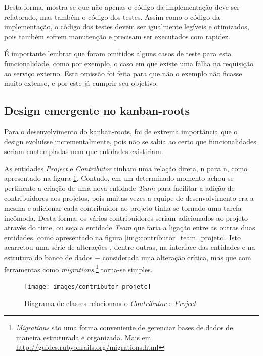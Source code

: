 Desta forma, mostra-se que não apenas o código da implementação deve ser refatorado, mas também o código dos testes. Assim como o código da implementação, o código dos testes devem ser igualmente legíveis e otimizados, pois também sofrem manutenção e precisam ser executados com rapidez.

É importante lembrar que foram omitidos alguns casos de teste para esta funcionalidade, como por exemplo, o caso em que existe uma falha na requisição ao serviço externo. Esta omissão foi feita para que não o exemplo não ficasse muito extenso, e por este já cumprir seu objetivo.


\subsection{Design emergente no kanban-roots}
\label{sub:design_emergente_no_kanban_roots}

Para o desenvolvimento do kanban-roots, foi de extrema importância que o design evoluísse incrementalmente, pois não se sabia ao certo que
funcionalidades seriam contempladas nem que entidades existiriam.

As entidades \textit{Project} e \textit{Contributor} tinham uma relação direta, n para n, como apresentado na figura \ref{img:contributor_projetc}. Contudo, em um determinado momento achou-se pertinente a criação de uma nova entidade \textit{Team} para facilitar a adição de contribuidores aos projetos, pois muitas vezes a equipe de desenvolvimento era a mesma e adicionar cada contribuidor ao projeto tinha se tornado uma tarefa incômoda. Desta forma, os vários contribuidores seriam adicionados ao projeto através do time, ou seja a entidade \textit{Team} que faria a ligação entre as outras duas entidades, como apresentado na figura \ref{img:contributor_team_projetc}. Isto acarretou uma série de alterações \cite{CommitAddTeam}, dentre outras, na interface das entidades e na estrutura do banco de dados $-$ considerada uma alteração crítica, mas que com ferramentas como \textit{migrations},\footnote{\textit{Migrations} são uma forma conveniente de gerenciar bases de dados de maneira estruturada e organizada. Mais em \url{http://guides.rubyonrails.org/migrations.html}} torna-se simples.

\begin{figure}[h]
  \center
  \caption{Diagrama de classes relacionando \textit{Contributor} e \textit{Project}}
  \texttt{[image: images/contributor\_projetc]}
  \label{img:contributor_projetc}
\end{figure}

